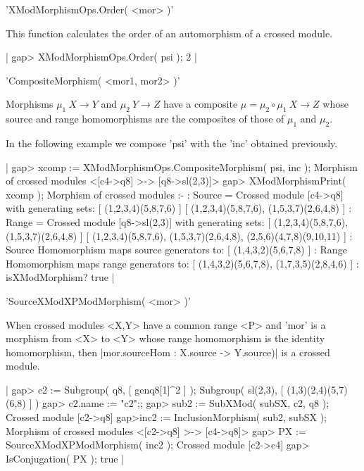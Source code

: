 %

'XModMorphismOps.Order( <mor> )'

This function calculates the order of an automorphism of a crossed module.

|    gap> XModMorphismOps.Order( psi );
    2   |

%

'CompositeMorphism( <mor1, mor2> )'

Morphisms $\mu_1 \: X \to Y$  and $\mu_2 \:  Y \to Z$ have a composite
$\mu   =  \mu_2 \circ  \mu_1    \: X \to   Z$ whose   source and range
homomorphisms are the composites of those of $\mu_1$ and $\mu_2$.

In the following example we compose 'psi' with the 'inc' obtained previously.

|    gap> xcomp := XModMorphismOps.CompositeMorphism( psi, inc );
    Morphism of crossed modules <[c4->q8] >-> [q8->sl(2,3)]> 
    gap> XModMorphismPrint( xcomp );
    Morphism of crossed modules :- 
    : Source = Crossed module [c4->q8] with generating sets:
      [ (1,2,3,4)(5,8,7,6) ]
      [ (1,2,3,4)(5,8,7,6), (1,5,3,7)(2,6,4,8) ]
    : Range = Crossed module [q8->sl(2,3)] with generating sets:
      [ (1,2,3,4)(5,8,7,6), (1,5,3,7)(2,6,4,8) ]
      [ (1,2,3,4)(5,8,7,6), (1,5,3,7)(2,6,4,8), (2,5,6)(4,7,8)(9,10,11) ]
    : Source Homomorphism maps source generators to:
      [ (1,4,3,2)(5,6,7,8) ]
    : Range Homomorphism maps range generators to:
      [ (1,4,3,2)(5,6,7,8), (1,7,3,5)(2,8,4,6) ]
    : isXModMorphism? true    |

%

'SourceXModXPModMorphism( <mor> )'

When  crossed modules <X,Y>  have a  common range <P>  and  'mor' is a
morphism from  <X> to <Y>  whose  range  homomorphism is the  identity
homomorphism,  then  |mor.sourceHom  :  X.source ->  Y.source)|   is a
crossed module.

|    gap> c2 := Subgroup( q8, [ genq8[1]^2 ] );
    Subgroup( sl(2,3), [ (1,3)(2,4)(5,7)(6,8) ] )
    gap> c2.name := "c2";;
    gap> sub2 := SubXMod( subSX, c2, q8 );
    Crossed module [c2->q8]
    gap>inc2 := InclusionMorphism( sub2, subSX );
    Morphism of crossed modules <[c2->q8] >-> [c4->q8]>
    gap> PX := SourceXModXPModMorphism( inc2 );
    Crossed module [c2->c4]
    gap> IsConjugation( PX );
    true   |

